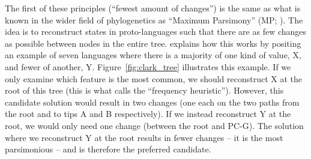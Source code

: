 \documentclass[12pt,letterpaper]{article}
\begin{document}


The first of these principles (``fewest amount of changes'') is the same as what is known in the wider field of phylogenetics as ``Maximum Parsimony'' (MP; \citealt{felsenstein2004inferring}). The idea is to reconstruct states in proto-languages such that there are as few changes as possible between nodes in the entire tree. \citet[17--22]{clark1973aspects} explains how this works by positing an example of seven languages where there is a majority of one kind of value, X, and fewer of another, Y. Figure~\ref{fig:clark_tree} illustrates this example. If we only examine which feature is the most common, we should reconstruct X at the root of this tree (this is what \citealt{goldstein_2022} calls the ``frequency heuristic''). However, this candidate solution would result in two changes (one each on the two paths from the root and to tips A and B respectively). If we instead reconstruct Y at the root, we would only need one change (between the root and PC-G). The solution where we reconstruct Y at the root results in fewer changes -- it is the most parsimonious -- and is therefore the preferred candidate.
 
\end{document}
